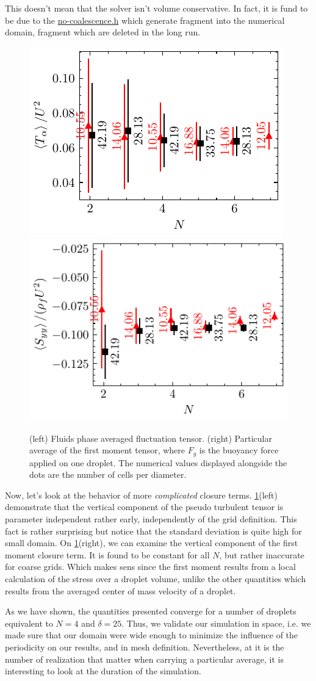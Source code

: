 This doesn't mean that the solver isn't volume conservative. 
In fact, it is fund to be due to the \href{http://basilisk.fr/sandbox/fintzin/Rising-Suspension/no-coalescence.h}{no-coalescence.h} which generate fragment into the numerical domain, fragment which are deleted in the long run. 
\begin{figure}[h!]
    \centering
    \includegraphics[height= 0.3\textwidth]{image/VALIDATION/N_and_delta/PA_UpUp.pdf}
    \includegraphics[height= 0.3\textwidth]{image/VALIDATION/N_and_delta/Mh.pdf}
    \caption{(left) Fluids phase averaged fluctuation tensor.
            (right) Particular average of the first moment tensor, where $F_g$ is the buoyancy force applied on one droplet. 
            The numerical values displayed alongside the dots are the number of cells per diameter.}
    \label{fig:VALIDATION_Nd_2}
\end{figure}
Now, let's look at the behavior of more \textit{complicated} closure terms. 
\ref{fig:VALIDATION_Nd_2}(left) demonstrate that the vertical component of the pseudo turbulent tensor is parameter independent rather early, independently of the grid definition. 
This fact is rather surprising but notice that the standard deviation is quite high for small domain. 
On \ref{fig:VALIDATION_Nd_2}(right), we can examine the vertical component of the first moment closure term. 
It is found to be constant for all $N$, but rather inaccurate for coarse grids. 
Which makes sens since the first moment results from a local calculation of the stress over a droplet volume, unlike the other quantities which results from the averaged center of mass velocity of a droplet. 

As we have shown, the quantities presented converge for a number of droplets equivalent to $N = 4$ and $\delta = 25$. 
Thus, we validate our simulation in space, i.e. we made sure that our domain were wide enough to minimize the influence of the periodicity on our results, and in mesh definition. 
Nevertheless, at it is the number of realization that matter when carrying a particular average, it is interesting to look at the duration of the simulation.


